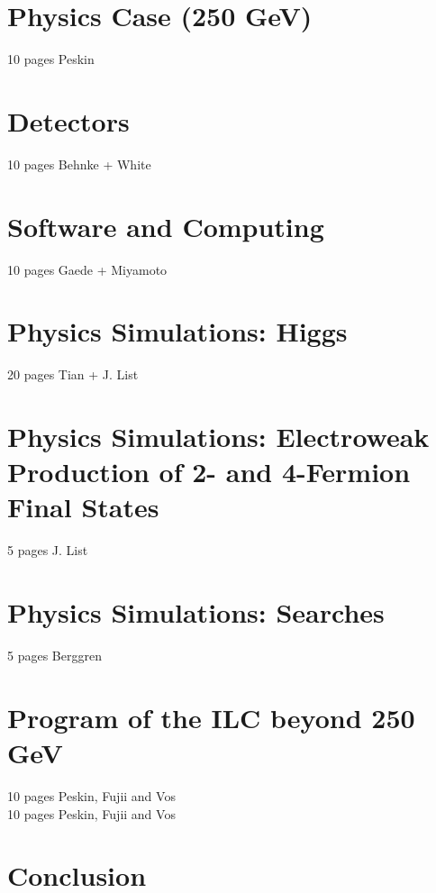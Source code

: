 \documentclass[%
 reprint,
 amsmath,amssymb,
 aps,
]{revtex4-1}
\begin{document}

   
   
\section{\label{sec:physics}Physics Case (250 GeV) }

10 pages Peskin
 

 
\section{\label{sec:detectors}Detectors }


  10 pages Behnke + White
  


\section{\label{sec:software}Software and Computing}

   10 pages Gaede + Miyamoto
   
   

\section{\label{sec:higgs}Physics Simulations: Higgs
}


  20 pages Tian + J. List
  
  

\section{\label{sec:ew}Physics Simulations: Electroweak Production of 2- and 4-Fermion Final States }


  5 pages J. List
  
  

\section{\label{sec:searches}Physics Simulations: Searches }


  5 pages Berggren
  
  

\section{\label{sec:ILC-HE}Program of the ILC beyond 250 GeV }
  10 pages Peskin, Fujii and Vos \\
  

  10 pages Peskin, Fujii and Vos
\section{\label{sec:conclusion}Conclusion}




%

\end{document}
